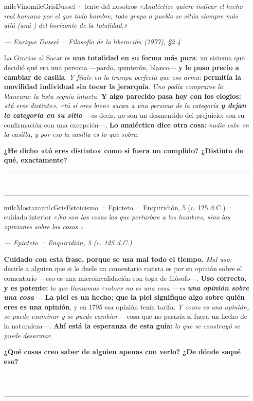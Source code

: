 \documentclass[11pt,letterpaper]{article}
\newcommand{\linead}[1]{\noindent\color{milcLinea}\rule{#1}{0.5pt}\color{milcNegro}}
\begin{document}
\begin{softbox}{milcVino}{milcGris}{Dussel · lente del nosotros}
\textit{«Analéctico quiere indicar el hecho real humano por el que todo hombre, todo grupo o pueblo se sitúa siempre más allá (aná-) del horizonte de la totalidad.»}

{\footnotesize\itshape\color{milcNegro!70}--- Enrique Dussel · Filosofía de la liberación (1977), §2.4}

La Gracias al Sacar es \textbf{una totalidad en su forma más pura}: un sistema que decidió qué era una persona ---pardo, quinterón, blanco--- \textbf{y le puso precio a cambiar de casilla}. \emph{Y fíjate en la trampa perfecta que eso arma:} \textbf{permitía la movilidad individual sin tocar la jerarquía}. \emph{Uno podía comprarse la blancura; la lista seguía intacta.} \textbf{Y algo parecido pasa hoy con los elogios:} \emph{«tú eres distinto», «tú sí eres bien» sacan a una persona de la categoría \textbf{y dejan la categoría en su sitio}} ---es decir, no son un desmentido del prejuicio: son su confirmación con una excepción---. \textbf{Lo analéctico dice otra cosa:} \emph{nadie cabe en la casilla, y por eso la casilla es lo que sobra.}

\textbf{¿He dicho «tú eres distinto» como si fuera un cumplido? ¿Distinto de qué, exactamente?}
\end{softbox}
\linead{\linewidth}\\[1mm]
\linead{\linewidth}

\begin{softbox}{milcMostaza}{milcGris}{Estoicismo · Epicteto · Enquiridión, 5 (c. 125 d.C.) · cuidado interior}
\textit{«No son las cosas las que perturban a los hombres, sino las opiniones sobre las cosas.»}

{\footnotesize\itshape\color{milcNegro!70}--- Epicteto · Enquiridión, 5 (c. 125 d.C.)}

\textbf{Cuidado con esta frase, porque se usa mal todo el tiempo.} \emph{Mal uso:} decirle a alguien que si le duele un comentario racista es por su opinión sobre el comentario ---eso es una microinvalidación con toga de filósofo---. \textbf{Uso correcto, y es potente:} \emph{lo que llamamos «color» no es una cosa ---es \textbf{una opinión sobre una cosa}---}. \textbf{La piel es un hecho; que la piel signifique algo sobre quién eres es una opinión}, y en 1795 esa opinión tenía tarifa. \emph{Y como es una opinión, se puede examinar y se puede cambiar} ---cosa que no pasaría si fuera un hecho de la naturaleza---. \textbf{Ahí está la esperanza de esta guía:} \emph{lo que se construyó se puede desarmar.}

\textbf{¿Qué cosas creo saber de alguien apenas con verlo? ¿De dónde saqué eso?}
\end{softbox}
\linead{\linewidth}\\[1mm]
\linead{\linewidth}
\end{document}
